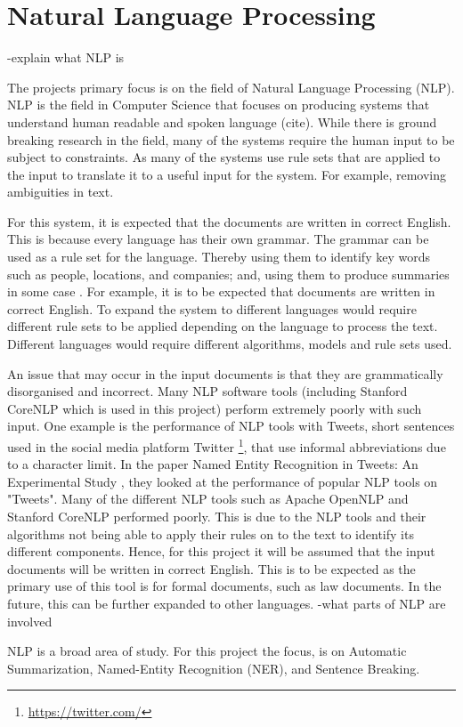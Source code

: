 \section{Natural Language Processing}
-explain what NLP is
\par The projects primary focus is on the field of Natural Language Processing (NLP). NLP is the field in Computer Science that focuses on producing systems that understand human readable and spoken language (cite). While there is ground breaking research in the field, many of the systems require the human input to be subject to constraints. As many of the systems use rule sets that are applied to the input to translate it to a useful input for the system. For example, removing ambiguities in text. 
\par For this system, it is expected that the documents are written in correct English. This is because every language has their own grammar. The grammar can be used as a rule set for the language. Thereby using them to identify key words such as people, locations, and companies; and, using them to produce summaries in some case \cite{dorrzajicschwartz2003}. For example, it is to be expected that documents are written in correct English. To expand the system to different languages would require different rule sets to be applied depending on the language to process the text. Different languages would require different algorithms, models and rule sets used.
\par An issue that may occur in the input documents is that they are grammatically disorganised and incorrect. Many NLP software tools (including Stanford CoreNLP which is used in this project) perform extremely poorly with such input. One example is the performance of NLP tools with Tweets, short sentences used in the social media platform Twitter \footnote{\url{https://twitter.com/}}, that use informal abbreviations due to a character limit. In the paper Named Entity Recognition in Tweets: An Experimental Study \cite{ritter2011}, they looked at the performance of popular NLP tools on "Tweets". Many of the different NLP tools such as Apache OpenNLP and Stanford CoreNLP performed poorly. This is due to the NLP tools and their algorithms not being able to apply their rules on to the text to identify its different components. Hence, for this project it will be assumed that the input documents will be written in correct English. This is to be expected as the primary use of this tool is for formal documents, such as law documents. In the future, this can be further expanded to other languages.
-what parts of NLP are involved
\par NLP is a broad area of study. For this project the focus, is on Automatic Summarization, Named-Entity Recognition (NER), and Sentence Breaking.

